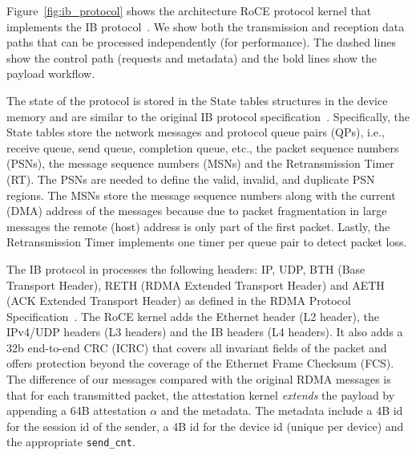 Figure~\ref{fig:ib_protocol} shows the architecture RoCE protocol kernel that implements the IB protocol~\cite{rdma_specification}.  We show both the transmission and reception data paths that can be processed independently (for performance). The dashed lines show the control path (requests and metadata) and the bold lines show the payload workflow.


The state of the protocol is stored in the State tables structures in the device memory and are similar to the original IB protocol specification~\cite{rdma_specification}. Specifically, the State tables store the network messages and protocol queue pairs (QPs), i.e., receive queue, send queue, completion queue, etc., the packet sequence numbers (PSNs), the message sequence numbers (MSNs) and the Retransmission Timer (RT). The PSNs are needed to define the valid, invalid, and duplicate PSN regions. The MSNs store the message sequence numbers along with the current
(DMA) address of the messages because due to packet fragmentation in large messages the remote (host) address is only part of the first packet. Lastly, the Retransmission Timer implements one timer per queue pair to detect packet loss. %

 The IB protocol in \projecttitle{} processes the following headers: IP, UDP, BTH (Base Transport Header), RETH (RDMA Extended Transport Header) and AETH (ACK Extended Transport Header) as defined in the RDMA Protocol Specification~\cite{rdma_specification, storm}.  The RoCE kernel adds the Ethernet header (L2 header), the IPv4/UDP headers (L3 headers) and the IB headers (L4 headers). It also adds a 32b end-to-end CRC (ICRC) that covers all invariant fields of the packet and offers protection beyond the coverage of the Ethernet Frame Checksum (FCS). The difference of our \projecttitle{} messages compared with the original RDMA messages is that for each transmitted packet, the attestation kernel {\em extends} the payload by appending a 64B attestation $\alpha$ and the metadata. The metadata include a 4B id for the session id of the sender, a 4B id for the device id (unique per device) and the appropriate {\tt send\_cnt}. %


